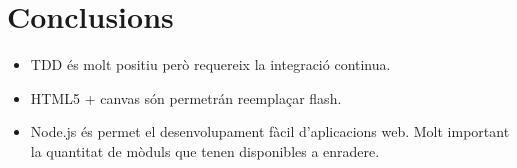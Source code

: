 \chapter{Conclusions}
\label{chap:conclusions}

\begin{itemize}
\item{TDD és molt positiu però requereix la integració continua.}
\item{HTML5 + canvas són permetrán reemplaçar flash.}
\item{Node.js és permet el desenvolupament fàcil d'aplicacions web. Molt important la quantitat de mòduls que tenen disponibles a enradere.}
\end{itemize}


